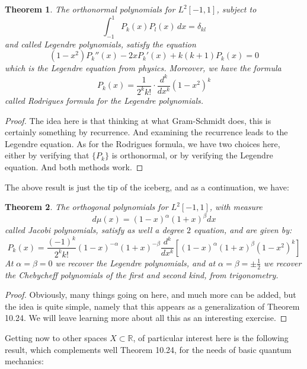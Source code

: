 \documentclass[12pt]{amsbook}
\newtheorem{theorem}{Theorem}[chapter]
\begin{document}

\begin{theorem}
The orthonormal polynomials for $L^2[-1,1]$, subject to
$$\int_{-1}^1P_k(x)P_l(x)\,dx=\delta_{kl}$$
and called Legendre polynomials, satisfy the equation
$$(1-x^2)P_k''(x)-2xP_k'(x)+k(k+1)P_k(x)=0$$
which is the Legendre equation from physics. Moreover, we have the formula
$$P_k(x)=\frac{1}{2^kk!}\cdot\frac{d^k}{dx^k}\left(1-x^2\right)^k$$
called Rodrigues formula for the Legendre polynomials.
\end{theorem}

\begin{proof}
The idea here is that thinking at what Gram-Schmidt does, this is certainly something by recurrence. And examining the recurrence leads to the Legendre equation. As for the Rodrigues formula, we have two choices here, either by verifying that $\{P_k\}$ is orthonormal, or by verifying the Legendre equation. And both methods work.
\end{proof}

The above result is just the tip of the iceberg, and as a continuation, we have:


\begin{theorem}
The orthogonal polynomials for $L^2[-1,1]$, with measure
$$d\mu(x)=(1-x)^\alpha(1+x)^\beta dx$$
called Jacobi polynomials, satisfy as well a degree $2$ equation, and are given by:
$$P_k(x)=\frac{(-1)^k}{2^kk!}(1-x)^{-\alpha}(1+x)^{-\beta}\frac{d^k}{dx^k}\left[(1-x)^\alpha(1+x)^\beta(1-x^2)^k\right]$$
At $\alpha=\beta=0$ we recover the Legendre polynomials, and at $\alpha=\beta=\pm\frac{1}{2}$ we recover the Chebycheff polynomials of the first and second kind, from trigonometry. 
\end{theorem}

\begin{proof}
Obviously, many things going on here, and much more can be added, but the idea is quite simple, namely that this appears as a generalization of Theorem 10.24. We will leave learning more about all this as an interesting exercise.
\end{proof}

Getting now to other spaces $X\subset\mathbb R$, of particular interest here is the following result, which complements well Theorem 10.24, for the needs of basic quantum mechanics:

\end{document}
